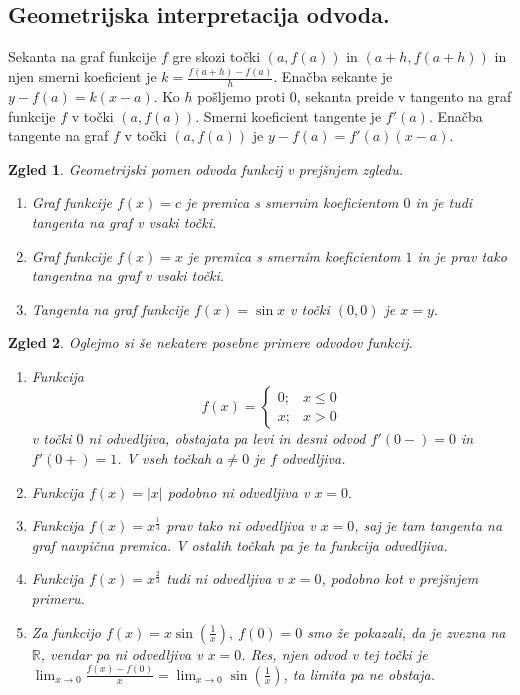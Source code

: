 \documentclass[10pt, a4paper]{article}
\newtheorem{zgled}{Zgled}[section]
\newcommand{\R}{\mathbb {R}}
\newcommand{\limf}[3]{\lim_{#1 \to #2} {#3}}
\begin{document}
\subsection{Geometrijska interpretacija odvoda.}

Sekanta na graf funkcije $f$ gre skozi točki $(a, f(a))$ in $(a+h, f(a+h))$
in njen smerni koeficient je $k = \frac{f(a+h) - f(a)}{h}$. 
Enačba sekante je $y - f(a) = k(x-a)$. Ko $h$ pošljemo proti $0$, sekanta preide v tangento
na graf funkcije $f$ v točki $(a, f(a)).$
Smerni koeficient tangente je $f'(a)$. 
Enačba tangente na graf $f$ v točki $(a, f(a))$ je $y - f(a) = f'(a)(x-a).$

\begin{zgled}
    Geometrijski pomen odvoda funkcij v prejšnjem zgledu.
    \begin{enumerate}
        \item Graf funkcije $f(x) = c$ je premica s smernim koeficientom $0$ in je tudi tangenta na graf v vsaki točki.
        \item Graf funkcije $f(x) = x$ je premica s smernim koeficientom $1$ in je prav tako tangentna na graf v vsaki točki.
        \item Tangenta na graf funkcije $f(x) = \sin{x}$ v točki $(0,0)$ je $x = y$.
    \end{enumerate}
\end{zgled}
\vspace{3mm}
\begin{zgled}
    Oglejmo si še nekatere posebne primere odvodov funkcij.
    \begin{enumerate}
        \item Funkcija $$f(x) = \begin{cases}
            0; & x \leq 0\\
            x; & x > 0
        \end{cases}$$ v točki $0$ ni odvedljiva, obstajata pa levi in desni odvod $f'(0-) = 0$ in $f'(0+) = 1$.
        V vseh točkah $a \neq 0$ je $f$ odvedljiva.
        \item Funkcija $f(x) = |x|$ podobno ni odvedljiva v $x = 0.$
        \item Funkcija $f(x) = x^{\frac{1}{3}}$ prav tako ni odvedljiva v $x = 0$, saj je tam tangenta na graf navpična premica.
        V ostalih točkah pa je ta funkcija odvedljiva.
        \item Funkcija $f(x) = x^{\frac{2}{3}}$ tudi ni odvedljiva v $x = 0$, podobno kot v prejšnjem primeru.
        \item Za funkcijo $f(x) = x \sin{\left(\frac{1}{x}\right)},\ f(0) = 0$ smo že pokazali, da je zvezna na $\R$,
        vendar pa ni odvedljiva v $x = 0$. Res, njen odvod v tej točki je $\limf{x}{0}{\frac{f(x)- f(0)}{x}} = \limf{x}{0}{\sin{\left(\frac{1}{x}\right)}}$, ta limita pa ne obstaja.
    \end{enumerate}
\end{zgled}
\end{document}
